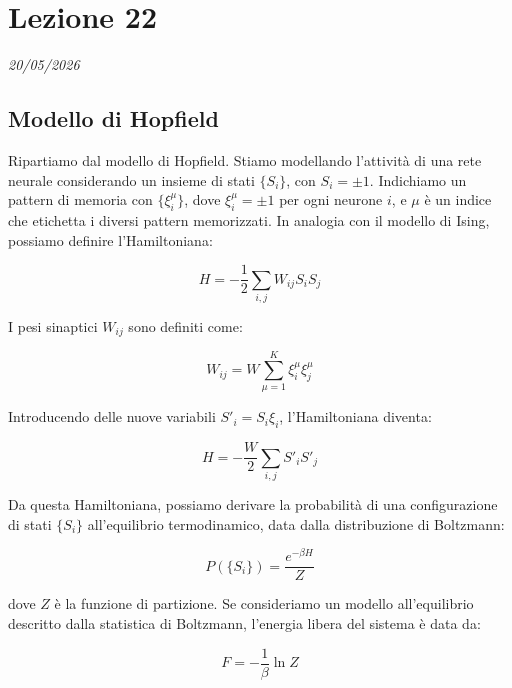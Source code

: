 \chapter{Lezione 22}
\label{capitolo_22}
\textit{20/05/2026}

\section{Modello di Hopfield}
Ripartiamo dal modello di Hopfield.
Stiamo modellando l'attività di una rete neurale considerando un insieme di stati $\{S_i\}$, con $S_i = \pm 1$.
Indichiamo un pattern di memoria con $\{\xi_i^\mu\}$, dove $\xi_i^\mu = \pm 1$ per ogni neurone $i$, e $\mu$ è un indice che etichetta i diversi pattern memorizzati.
In analogia con il modello di Ising, possiamo definire l'Hamiltoniana:

\begin{equation} \label{eq:ch22_1}
H = -\frac{1}{2} \sum_{i, j} W_{ij}S_iS_j
\end{equation}

I pesi sinaptici $W_{ij}$ sono definiti come:

\begin{equation} \label{eq:ch22_2}
W_{ij} = W \sum_{\mu=1}^{K} \xi_i^\mu \xi_j^\mu
\end{equation}

Introducendo delle nuove variabili $S'_i = S_i \xi_i$, l'Hamiltoniana diventa:

\begin{equation} \label{eq:ch22_3}
H = -\frac{W}{2}\sum_{i,j} S'_i S'_j
\end{equation}

Da questa Hamiltoniana, possiamo derivare la probabilità di una configurazione di stati $\{S_i\}$ all'equilibrio termodinamico, data dalla distribuzione di Boltzmann:

\begin{equation} \label{eq:ch22_4}
P(\{S_i\}) = \frac{e^{-\beta H}}{Z}
\end{equation}

dove $Z$ è la funzione di partizione.
Se consideriamo un modello all'equilibrio descritto dalla statistica di Boltzmann, l'energia libera del sistema è data da:

\begin{equation} \label{eq:ch22_5}
F = -\frac{1}{\beta} \ln Z
\end{equation}


